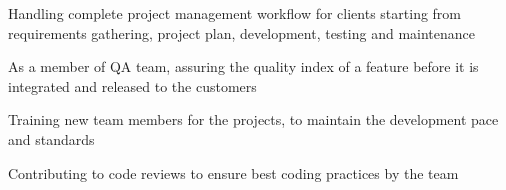\begin{cventries}
  \cventry
    {}
    {}
    {}
    {}
    {
      \begin{cvitems}
        \item {Handling complete project management workflow for clients starting from requirements gathering, project plan, development, testing and maintenance}
        \item {As a member of QA team, assuring the quality index of a feature before it is integrated and released to the customers}
        \item {Training new team members for the projects, to maintain the development pace and standards}
        \item {Contributing to code reviews to ensure best coding practices by the team}
      \end{cvitems}
    }
\end{cventries}